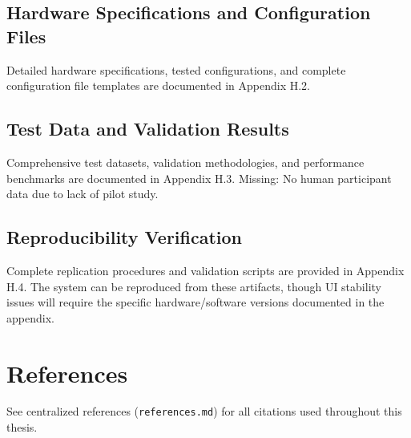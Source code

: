 \subsection{Hardware Specifications and Configuration Files}
Detailed hardware specifications, tested configurations, and complete configuration file templates are documented in Appendix H.2.

\subsection{Test Data and Validation Results}
Comprehensive test datasets, validation methodologies, and performance benchmarks are documented in Appendix H.3. Missing: No human participant data due to lack of pilot study.

\subsection{Reproducibility Verification}
Complete replication procedures and validation scripts are provided in Appendix H.4. The system can be reproduced from these artifacts, though UI stability issues will require the specific hardware/software versions documented in the appendix.

\section{References}
See centralized references (\texttt{references.md}) for all citations used throughout this thesis.
